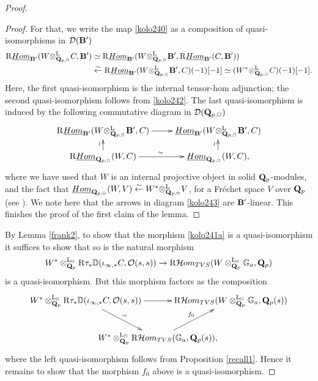 \documentclass[10pt,reqno]{amsart}
\let\cal\mathcal
\theoremstyle{definition}
\theoremstyle{remark}
\newcommand{\uHom}{\underline{{\rm{Hom}} }}
\newcommand{\Hhom}{{\cal Hom}}
\newcommand{\LL}{\operatorname{L} }
\newcommand{\so}{{\mathcal O}}
\newcommand{\sd}{{\mathcal{D}}}
\numberwithin{equation}{section}
\def\R{{\mathrm R}}
\def\Q{{\bf Q}} \def\Z{{\bf Z}}
\numberwithin{equation}{section}
\begin{document}
\begin{proof}
\begin{proof}
   For that, we write the map \eqref{kolo240} as a composition of quasi-isomorphisms in $\sd(\B^{\prime})$
\begin{align*}
 \R\uHom_{\B^{\prime}}(W{\otimes^{\LL}_{\Q_{p,\Box}}}C,\B^{\prime}) & \simeq  \R\uHom_{\B^{\prime}}(W{\otimes^{\LL}_{\Q_{p,\Box}}}\B^{\prime},\R\uHom_{\B^{\prime}}(C,\B^{\prime}) )\\ &  \stackrel{\sim}{\leftarrow} \R\uHom_{\B^{\prime}}(W{\otimes^{\LL}_{\Q_{p,\Box}}}\B^{\prime},C)(-1)[-1] 
   \simeq (W^*{\otimes^{\LL}_{\Q_{p,\Box}}}C)(-1)[-1].
\end{align*}
 Here, the first quasi-isomorphism is the internal tensor-hom adjunction; the second quasi-isomorphism follows from \eqref{kolo242}.  The last quasi-isomorphism is induced by   the following commutative diagram in $\sd(\Q_{p,\Box})$
\begin{equation}\label{kolo243}
\xymatrix@R4mm{
\R\uHom_{\B^{\prime}}(W{\otimes^{\LL}_{\Q_{p,\Box}}}\B^{\prime},C)\ar[r] & \uHom_{\B^{\prime}}(W{\otimes^{\LL}_{\Q_{p,\Box}}}\B^{\prime},C)\\
\R\uHom_{\Q_{p,\Box}}(W,C)\ar[u]^{\wr}\ar[r]^{\sim} & \uHom_{\Q_{p,\Box}}(W,C)\ar[u]^{\wr},
}
\end{equation}
where  we have used  that  $W$ is an internal  projective object in solid $\Q_p$-modules,  and the fact that ${\uHom}_{\Q_{p,\Box}}(W,V)\stackrel{\sim}{\leftarrow}W^*{\otimes^{\LL}_{\Q_{p,\Box}}}V$, for a Fr\'echet space $V$ over $\Q_p$ (see \cite[Th. 3.40]{RR1}). We note here that the  arrows in diagram \eqref{kolo243} are ${\bf B}^{\prime}$-linear. This finishes the proof of the first claim of the lemma.
 \end{proof}

  
     By Lemma \ref{frank2}, to show  that the morphism \eqref{kolo241a} is a quasi-isomorphism it suffices to show that so is the natural morphism
  \begin{equation}\label{frank1}
   W^*\otimes_{\Q_{p}}^{\LL_{\Box}}\R\tau_*{\mathbb D}(\iota_{\infty,*}C, \so(s,s))\to \R\Hhom_{\rm TVS}(W\otimes^{\LL_{\Box}}_{\Q_{p}}{\mathbb G}_a,\Q_p)
  \end{equation}
  is a quasi-isomorphism. But this morphism factors as the composition
  $$
  \xymatrix@C=-2cm{
  W^*\otimes_{\Q_{p}}^{\LL_{\Box}}\R\tau_*{\mathbb D}(\iota_{\infty,*}C, \so(s,s))\ar[rr] \ar[dr]^{\sim}& & \R\Hhom_{\rm TVS}(W\otimes^{\LL_{\Box}}_{\Q_{p}}{\mathbb G}_a,\Q_p(s))\\
  & W^*\otimes^{\LL_{\Box}}_{\Q_{p}} \R\Hhom_{\rm TVS}({\mathbb G}_a,\Q_p(s))\ar[ru]^{f_0},
  }
  $$
  where the left quasi-isomorphism follows from Proposition \ref{recall1}. 
  Hence it remains to show that the morphism $f_0$ above is a quasi-isomorphism. 
  

\end{proof}
\end{document}
